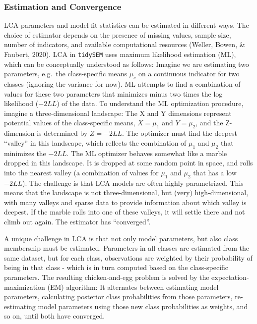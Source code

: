 \documentclass[
  ,man,floatsintext]{apa6}
\begin{document}
\hypertarget{estimation-and-convergence}{%
\subsubsection{Estimation and Convergence}\label{estimation-and-convergence}}

LCA parameters and model fit statistics can be estimated in different
ways.
The choice of estimator depends on the presence of missing
values, sample size, number of indicators, and available computational
resources (Weller, Bowen, \& Faubert, 2020).
LCA in \texttt{tidySEM} uses maximum likelihood estimation (ML), which can be conceptually understood as follows:
Imagine we are estimating two
parameters, e.g.~the class-specific means \(\mu_c\) on a continuous indicator for two classes
(ignoring the variance for now).
ML attempts to find a combination of values for these two parameters that minimizes minus two times the log likelihood (\(-2LL\)) of the data.
To understand the ML optimization procedure,
imagine a three-dimensional landscape:
The X and Y dimensions represent potential values of the class-specific means, \(X = \mu_1\) and \(Y = \mu_2\), and the Z-dimension is determined by \(Z = -2LL\).
The optimizer must find the
deepest ``valley'' in this landscape,
which reflects the combination of \(\mu_1\) and \(\mu_2\) that minimizes the \(-2LL\).
The ML
optimizer behaves somewhat like a marble dropped in this landscape. It
is dropped at some random point in space, and rolls into the nearest valley (a combination of values for \(\mu_1\) and \(\mu_2\) that has a low \(-2LL\)).
The challenge is that LCA models are often highly parametrized.
This means that the landscape is not three-dimensional, but (very) high-dimensional,
with many valleys and sparse data to provide information about which valley is deepest.
If the marble rolls into one of these valleys,
it will settle there and not climb out again.
The estimator has ``converged''.

A unique challenge in LCA is that not only model parameters,
but also class membership must be estimated.
Parameters in all classes are estimated from the same dataset,
but for each class,
observations are weighted by their probability of being in that class - which is in turn computed based on the class-specific parameters.
The resulting chicken-and-egg problem is solved by the expectation-maximization (EM) algorithm:
It alternates between estimating model parameters,
calculating posterior class probabilities from those parameters,
re-estimating model parameters using those new class probabilities as weights, and so on, until both have converged.
\end{document}

